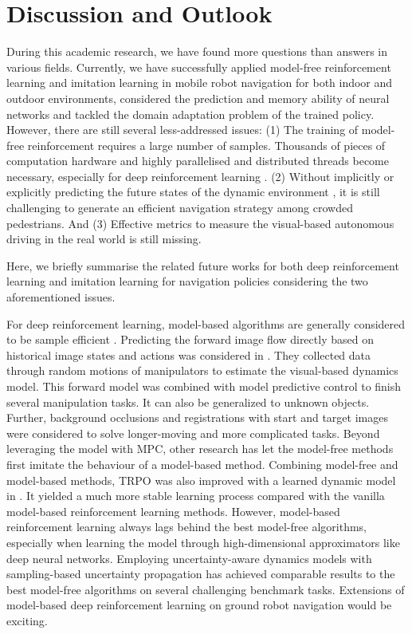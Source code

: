 \section{Discussion and Outlook}
During this academic research, we have found more questions than answers in various fields. Currently, we have successfully applied model-free reinforcement learning and imitation learning in mobile robot navigation for both indoor and outdoor environments, considered the prediction and memory ability of neural networks and tackled the domain adaptation problem of the trained policy. However, there are still several less-addressed issues:
(1) The training of model-free reinforcement requires a large number of samples. Thousands of pieces of computation hardware and highly parallelised and distributed threads become necessary, especially for deep reinforcement learning \cite{barthmaron2018distributional, espeholt2018impala}. (2) Without implicitly or explicitly predicting the future states of the dynamic environment \cite{alahi2016social, chen2018crowd}, it is still challenging to generate an efficient navigation strategy among crowded pedestrians. And (3) Effective metrics to measure the visual-based autonomous driving in the real world is still missing.

Here, we briefly summarise the related future works for both deep reinforcement learning and imitation learning for navigation policies considering the two aforementioned issues.

For deep reinforcement learning, model-based algorithms are generally considered to be sample efficient \cite{deisenroth2013survey}. Predicting the forward image flow directly based on historical image states and actions was considered in \cite{finn2017deep}. They collected data through random motions of manipulators to estimate the visual-based dynamics model. This forward model was combined with model predictive control to finish several manipulation tasks. It can also be generalized to unknown objects.
Further, background occlusions \cite{ebert2017self} and registrations with start and target images \cite{ebert2018robustness} were considered to solve longer-moving and more complicated tasks.
Beyond leveraging the model with MPC, other research \cite{nagabandi2018neural} has let the model-free methods first imitate the behaviour of a model-based method. Combining model-free and model-based methods, TRPO \cite{schulman2015trust} was also improved with a learned dynamic model in \cite{kurutach2018model}. It yielded a much more stable learning process compared with the vanilla model-based reinforcement learning methods.
However, model-based reinforcement learning always lags behind the best model-free algorithms, especially when learning the model through high-dimensional approximators like deep neural networks. Employing uncertainty-aware dynamics models with sampling-based uncertainty propagation \cite{chua2018deep} has achieved comparable results to the best model-free algorithms on several challenging benchmark tasks. Extensions of model-based deep reinforcement learning on ground robot navigation would be exciting.

